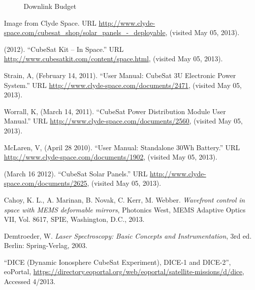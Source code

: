 \documentclass[12pt]{article}
\begin{document}
\begin{figure}[ht]
\centering 
\caption{Downlink Budget}
\end{figure}

\noindent
\newline
\newpage


\begin{thebibliography}{9}








Image from Clyde Space.  URL \url{http://www.clyde-space.com/cubesat_shop/solar_panels_-_deployable}, (visited May 05, 2013).

 (2012).  ``CubeSat Kit -- In Space.''  URL \url{http://www.cubesatkit.com/content/space.html}, (visited May 05, 2013).

 Strain, A, (February 14, 2011).  ``User Manual: CubeSat 3U Electronic Power System.'' URL \url{http://www.clyde-space.com/documents/2471}, (visited May 05, 2013).

 Worrall, K, (March 14, 2011).  ``CubeSat Power Distribution Module User Manual.'' URL \url{http://www.clyde-space.com/documents/2560}, (visited May 05, 2013).

 McLaren, V, (April 28 2010).  ``User Manual: Standalone 30Wh Battery.''  URL \url{http://www.clyde-space.com/documents/1902}, (visited May 05, 2013).

 (March 16 2012). ``CubeSat Solar Panels.''  URL \url{http://www.clyde-space.com/documents/2625}, (visited May 05, 2013).



   Cahoy, K. L., A. Marinan, B. Novak, C. Kerr, M. Webber. 
   \emph{Wavefront control in space with MEMS deformable mirrors}, Photonics West, MEMS Adaptive Optics VII, Vol. 8617, SPIE, Washington, D.C., 2013.
 
   Demtroeder, W.
   \emph{Laser Spectroscopy: Basic Concepts and Instrumentation}, 3rd ed. Berlin: Spring-Verlag, 2003.

“DICE (Dynamic Ionosphere CubeSat Experiment), DICE-1 and DICE-2”, eoPortal, \url{https://directory.eoportal.org/web/eoportal/satellite-missions/d/dice}, Accessed 4/2013.


\end{thebibliography}
\end{document}
